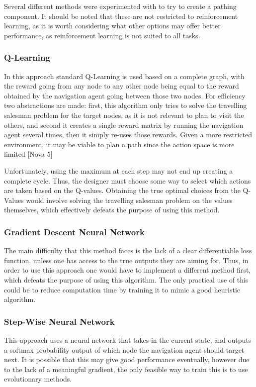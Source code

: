 \documentclass{article}
\begin{document}
	Several different methods were experimented with to try to create a pathing component. It should be noted that these are not restricted to reinforcement learning, as it is worth considering what other options may offer better performance, as reinforcement learning is not suited to all tasks.
	
	\subsubsection{Q-Learning}
	In this approach standard Q-Learning is used based on a complete graph, with the reward going from any node to any other node being equal to the reward obtained by the navigation agent going between those two nodes. For efficiency two abstractions are made: first, this algorithm only tries to solve the travelling salesman problem for the target nodes, as it is not relevant to plan to visit the others, and second it creates a single reward matrix by running the navigation agent several times, then it simply re-uses those rewards. Given a more restricted environment, it may be viable to plan a path since the action space is more limited [Nova 5]
	
	Unfortunately, using the maximum at each step may not end up creating a complete cycle. Thus, the designer must choose some way to select which actions are taken based on the Q-values. Obtaining the true optimal choices from the Q-Values would involve solving the travelling salesman problem on the values themselves, which effectively defeats the purpose of using this method.
	
	\subsubsection{Gradient Descent Neural Network}
	The main difficulty that this method faces is the lack of a clear differentiable loss function, unless one has access to the true outputs they are aiming for. Thus, in order to use this approach one would have to implement a different method first, which defeats the purpose of using this algorithm. The only practical use of this could be to reduce computation time by training it to mimic a good heuristic algorithm.
	
	\subsubsection{Step-Wise Neural Network}
	This approach uses a neural network that takes in the current state, and outputs a softmax probability output of which node the navigation agent should target next. It is possible that this may give good performance eventually, however due to the lack of a meaningful gradient, the only feasible way to train this is to use evolutionary methods.
	
\end{document}
